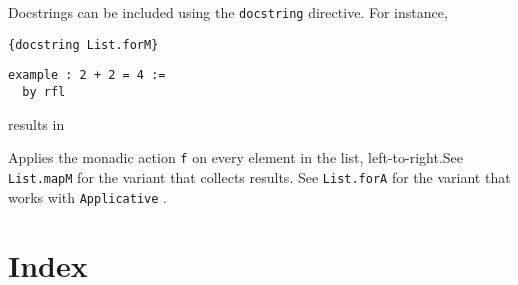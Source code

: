 \documentclass{memoir}
\begin{document}
Docstrings can be included using the \Verb|docstring| directive. For instance,

\begin{verbatim}
{docstring List.forM}

\end{verbatim}


\begin{verbatim}
example : 2 + 2 = 4 :=
  by rfl

\end{verbatim}


results in

Applies the monadic action \Verb|f|
 on every element in the list, left-to-right.See \Verb|List.mapM|
 for the variant that collects results.
See \Verb|List.forA|
 for the variant that works with \Verb|Applicative|
.




\chapter{Index}
\end{document}
